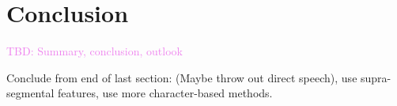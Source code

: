 \chapter{Conclusion}\label{conclusion}
\textcolor{violet}{
TBD: Summary, conclusion, outlook
}

Conclude from end of last section: (Maybe throw out direct speech), use supra-segmental features, use more character-based methods.






